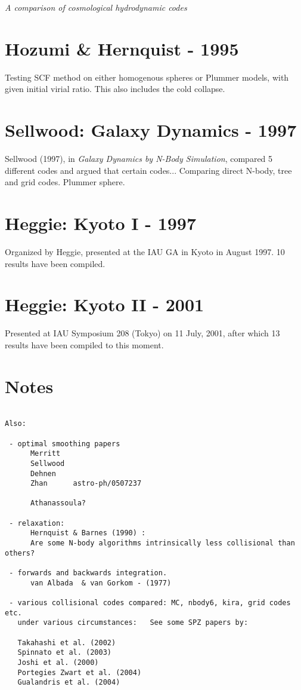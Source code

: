 {\it A comparison of cosmological hydrodynamic codes}

\section{Hozumi \& Hernquist - 1995}

Testing SCF method on either homogenous spheres or Plummer models, with
given initial virial ratio. This also includes the cold collapse.

\section{Sellwood: Galaxy Dynamics - 1997}

Sellwood (1997), in {\it Galaxy Dynamics by N-Body Simulation},
compared 5 different codes and argued that certain codes...
Comparing direct N-body, tree and grid codes. Plummer
sphere.


\section{Heggie: Kyoto I - 1997}

Organized by Heggie, presented at the IAU GA in Kyoto in August 1997. 10 results
have been compiled.

\section{Heggie: Kyoto II - 2001}

Presented at IAU Symposium 208 (Tokyo) on 11 July, 2001, after which 13 results
have been compiled to this moment.

\section{Notes}
\begin{verbatim}

Also:

 - optimal smoothing papers
      Merritt
      Sellwood
      Dehnen
      Zhan      astro-ph/0507237

      Athanassoula?

 - relaxation:
      Hernquist & Barnes (1990) : 
      Are some N-body algorithms intrinsically less collisional than others?

 - forwards and backwards integration. 
      van Albada  & van Gorkom - (1977)

 - various collisional codes compared: MC, nbody6, kira, grid codes etc.
   under various circumstances:   See some SPZ papers by:

   Takahashi et al. (2002)
   Spinnato et al. (2003)  
   Joshi et al. (2000)
   Portegies Zwart et al. (2004)
   Gualandris et al. (2004)
   

\end{verbatim}

